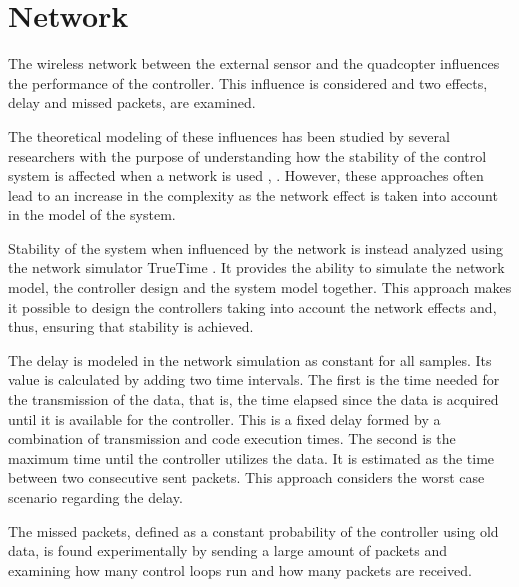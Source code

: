 \section{Network}\label{sec:network}
The wireless network between the external sensor and the quadcopter influences the performance of the controller. This influence is considered and two effects, delay and missed packets, are examined.


The theoretical modeling of these influences has been studied by several researchers with the purpose of understanding how the stability of the control system is affected when a network is used \cite{ling}, \cite{nirupam}. However, these approaches often lead to an increase in the complexity as the network effect is taken into account in the model of the system.

Stability of the system when influenced by the network is instead analyzed using the network simulator TrueTime \cite{TrueTimeNew}. It provides the ability to simulate the network model, the controller design and the system model together. This approach makes it possible to design the controllers taking into account the network effects and, thus, ensuring that stability is achieved.

The delay is modeled in the network simulation as constant for all samples. Its value is calculated by adding two time intervals. The first is the time needed for the transmission of the data, that is, the time elapsed since the data is acquired until it is available for the controller. This is a fixed delay formed by a combination of transmission and code execution times. The second is the maximum time until the controller utilizes the data. It is estimated as the time between two consecutive sent packets. This approach considers the worst case scenario regarding the delay.

The missed packets, defined as a constant probability of the controller using old data, is found experimentally by sending a large amount of packets and examining how many control loops run and how many packets are received. 
